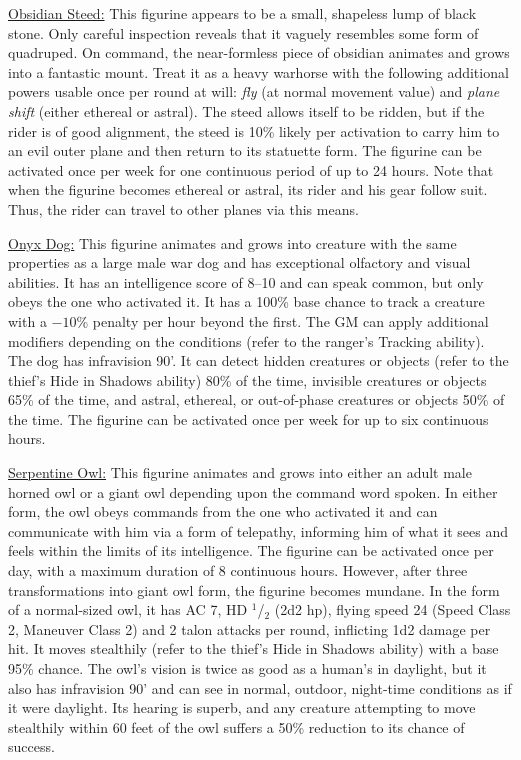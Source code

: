 \begin{multicols}{2}
\underline{Obsidian Steed:} This figurine appears to be a small, shapeless lump of black stone.  Only careful inspection reveals that it vaguely resembles some form of quadruped.  On command, the near-formless piece of obsidian animates and grows into a fantastic mount.  Treat it as a heavy warhorse with the following additional powers usable once per round at will: \textit{fly} (at normal movement value) and \textit{plane shift} (either ethereal or astral).  The steed allows itself to be ridden, but if the rider is of good alignment, the steed is 10\% likely per activation to carry him to an evil outer plane and then return to its statuette form.  The figurine can be activated once per week for one continuous period of up to 24 hours.  Note that when the figurine becomes ethereal or astral, its rider and his gear follow suit.  Thus, the rider can travel to other planes via this means.

\underline{Onyx Dog:} This figurine animates and grows into creature with the same properties as a large male war dog and has exceptional olfactory and visual abilities.  It has an intelligence score of 8--10 and can speak common, but only obeys the one who activated it.  It has a 100\% base chance to track a creature with a $-10$\% penalty per hour beyond the first.  The GM can apply additional modifiers depending on the conditions (refer to the ranger's Tracking ability).  The dog has infravision 90'.  It can detect hidden creatures or objects (refer to the thief's Hide in Shadows ability) 80\% of the time, invisible creatures or objects 65\% of the time, and astral, ethereal, or out-of-phase creatures or objects 50\% of the time.  The figurine can be activated once per week for up to six continuous hours.
 
\underline{Serpentine Owl:} This figurine animates and grows into either an adult male horned owl or a giant owl depending upon the command word spoken.  In either form, the owl obeys commands from the one who activated it and can communicate with him via a form of telepathy, informing him of what it sees and feels within the limits of its intelligence.  The figurine can be activated once per day, with a maximum duration of 8 continuous hours.  However, after three transformations into giant owl form, the figurine becomes mundane.  In the form of a normal-sized owl, it has AC 7, HD $^1$/$_2$ (2d2 hp), flying speed 24 (Speed Class 2, Maneuver Class 2) and 2 talon attacks per round, inflicting 1d2 damage per hit.  It moves stealthily (refer to the thief's Hide in Shadows ability) with a base 95\% chance.  The owl's vision is twice as good as a human's in daylight, but it also has infravision 90' and can see in normal, outdoor, night-time conditions as if it were daylight.  Its hearing is superb, and any creature attempting to move stealthily within 60 feet of the owl suffers a 50\% reduction to its chance of success.  


\end{multicols}

